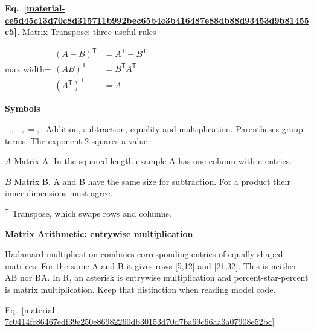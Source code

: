 \documentclass[11pt,a4paper]{article}
\begin{document}
\par\medskip
\noindent\begin{minipage}{\linewidth}
\label{material-ce5d45c13d70c8d315711b992bec65b4c3b416487e88db88d93453d9b81455c5}
\noindent\textbf{Eq.~\ref*{material-ce5d45c13d70c8d315711b992bec65b4c3b416487e88db88d93453d9b81455c5}.} Matrix Transpose: three useful rules\par\nopagebreak
\begin{center}\begin{adjustbox}{max width=\linewidth}$\displaystyle \begin{aligned}(A-B)^{\mathsf T}&=A^{\mathsf T}-B^{\mathsf T}\\[.65em](AB)^{\mathsf T}&=B^{\mathsf T}A^{\mathsf T}\\[.65em](A^{\mathsf T})^{\mathsf T}&=A\end{aligned}$\end{adjustbox}\end{center}

\par\noindent\textbf{Symbols}

\par\noindent\textbf{\(+,-,=,\cdot\)} Addition, subtraction, equality and multiplication. Parentheses group terms. The exponent 2 squares a value.

\par\noindent\textbf{\(A\)} Matrix A. In the squared-length example A has one column with n entries.

\par\noindent\textbf{\(B\)} Matrix B. A and B have the same size for subtraction. For a product their inner dimensions must agree.

\par\noindent\textbf{\({}^{\mathsf T}\)} Transpose, which swaps rows and columns.

\end{minipage}\par
\medskip

\textbf{Matrix Arithmetic: entrywise multiplication}


Hadamard multiplication combines corresponding entries of equally shaped matrices. For the same A and B it gives rows [5,12] and [21,32]. This is neither AB nor BA. In R, an asterisk is entrywise multiplication and percent-star-percent is matrix multiplication. Keep that distinction when reading model code.


\hyperref[material-7c0414fc86467edf39e250e86982260db30153d70d7ba69c66aa3a07908e52bc]{Eq.~\ref*{material-7c0414fc86467edf39e250e86982260db30153d70d7ba69c66aa3a07908e52bc}}
\end{document}

